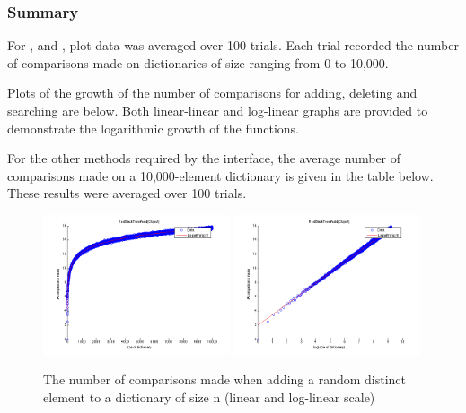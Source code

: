 \subsubsection{Summary}
For ,  and , plot data was averaged over 100 trials. Each trial recorded the number of comparisons made on dictionaries of size ranging from 0 to 10,000.

Plots of the growth of the number of comparisons for adding, deleting and searching are below. Both linear-linear and log-linear graphs are provided to demonstrate the logarithmic growth of the functions.

For the other methods required by the  interface, the average number of comparisons made on a 10,000-element dictionary is given in the table below. These results were averaged over 100 trials.

\begin{figure}[!htbpp]
    \centering
    \includegraphics[width=0.49\textwidth]{resources/add}
    \includegraphics[width=0.49\textwidth]{resources/add_log}
    \caption{The number of comparisons made when adding a random distinct element to a dictionary of size n (linear and log-linear scale)}

\end{figure}

